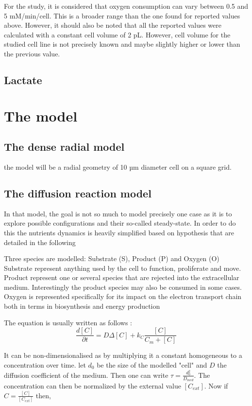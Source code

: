 \documentclass[11pt,a4paper]{article}
\begin{document}
For the study, it is considered that oxygen consumption can vary between 0.5 and 5 mM/min/cell. This is a broader range than the one found for reported values above. However, it should also be noted that all the reported values were calculated with a constant cell volume of 2 pL. However, cell volume for the studied cell line is not precisely known and maybe slightly higher or lower than the previous value.\\

\subsection{}

\subsection{Lactate}

\section{The model}
\subsection{The dense radial model}
the model will be a radial geometry of 10 µm diameter cell on a square grid.

\subsection{The diffusion reaction model}
In that model, the goal is not so much to model precisely one case as it is to explore possible configurations and their so-called steady-state. In order to do this the nutrients dynamics is heavily simplified based on hypothesis that are detailed in the following

Three species are modelled: Substrate (S),  Product (P) and Oxygen (O)
Substrate represent anything used by the cell to function, proliferate and move. Product represent one or several species that are rejected into the extracellular medium. Interestingly the product species may also be consumed in some cases. Oxygen is represented specifically for its impact on the electron transport chain both in terms in biosynthesis and energy production 

The equation is usually written as follows : 
\[ \frac{d [C]}{\partial t}  =  D \Delta [C] + k_C \frac{[C]}{C_m + [C]} \]

It can be non-dimensionalised as by multiplying it a constant homogeneous to a concentration over time. let $d_0$ be the size of the modelled "cell" 
and $D$ the diffusion coefficient of the medium. Then one can write $\tau  = \frac{d_0^2}{D_{med}}$. The concentration can then be normalized by the external value $[C_{ext}]$. Now if $C = \frac{[C]}{[C_{ext}]}$ then, 
\end{document}
